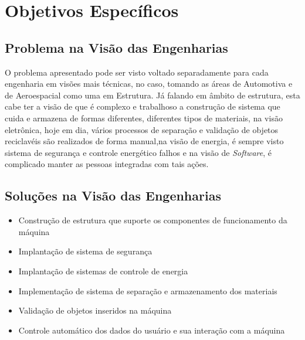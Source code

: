 \section{Objetivos Específicos}

\subsection{Problema na Visão das Engenharias}
O problema apresentado pode ser visto voltado separadamente para cada engenharia em visões mais técnicas, no caso, tomando as áreas de Automotiva e de Aeroespacial como uma em Estrutura. Já falando em âmbito de estrutura, esta cabe ter a visão de que é complexo e trabalhoso a construção de sistema que cuida e armazena de formas diferentes, diferentes tipos de materiais, na visão eletrônica, hoje em dia, vários processos de separação e validação de objetos reciclavéis são realizados de forma manual,na visão de energia, é sempre visto sistema de segurança e controle energético falhos e na visão de \textit{Software}, é complicado manter as pessoas integradas com tais ações.

\subsection{Soluções na Visão das Engenharias}
\begin{itemize}
\item Construção de estrutura que suporte os componentes de funcionamento da máquina
\item Implantação de sistema de segurança
\item Implantação de sistemas de controle de energia
\item Implementação de sistema de separação e armazenamento dos materiais
\item Validação de objetos inseridos na máquina
\item Controle automático dos dados do usuário e sua interação com a máquina
\end{itemize}